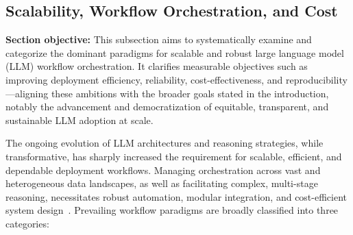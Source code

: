 \documentclass[sigconf]{acmart}
\begin{document}
\subsection{Scalability, Workflow Orchestration, and Cost}

\textbf{Section objective:} This subsection aims to systematically examine and categorize the dominant paradigms for scalable and robust large language model (LLM) workflow orchestration. It clarifies measurable objectives such as improving deployment efficiency, reliability, cost-effectiveness, and reproducibility—aligning these ambitions with the broader goals stated in the introduction, notably the advancement and democratization of equitable, transparent, and sustainable LLM adoption at scale.

The ongoing evolution of LLM architectures and reasoning strategies, while transformative, has sharply increased the requirement for scalable, efficient, and dependable deployment workflows. Managing orchestration across vast and heterogeneous data landscapes, as well as facilitating complex, multi-stage reasoning, necessitates robust automation, modular integration, and cost-efficient system design~\cite{ref5,ref8,ref9,ref12,ref37,ref43,ref50,ref55,ref57,ref60,ref64,ref79,ref80,ref86,ref88,ref89,ref104}. Prevailing workflow paradigms are broadly classified into three categories:
\end{document}
